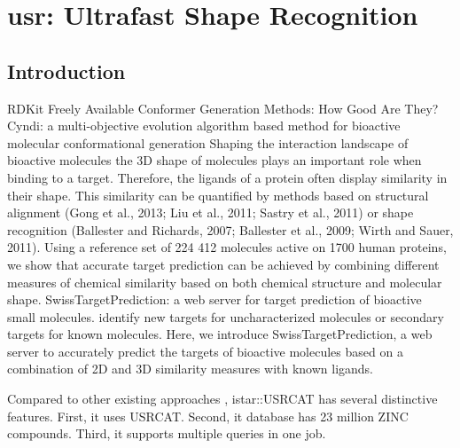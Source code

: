 \chapter{usr: Ultrafast Shape Recognition}

\section{Introduction}

RDKit
\citep{1127} Freely Available Conformer Generation Methods: How Good Are They?
\citep{1393,1394} Cyndi: a multi-objective evolution algorithm based method for bioactive molecular conformational generation
\citep{1407} Shaping the interaction landscape of bioactive molecules
\citep{1407} the 3D shape of molecules plays an important role when binding to a target. Therefore, the ligands of a protein often display similarity in their shape. This similarity can be quantified by methods based on structural alignment (Gong et al., 2013; Liu et al., 2011; Sastry et al., 2011) or shape recognition (Ballester and Richards, 2007; Ballester et al., 2009; Wirth and Sauer, 2011).
\citep{1407} Using a reference set of 224 412 molecules active on 1700 human proteins, we show that accurate target prediction can be achieved by combining different measures of chemical similarity based on both chemical structure and molecular shape.
\citep{1408} SwissTargetPrediction: a web server for target prediction of bioactive small molecules. identify new targets for uncharacterized molecules or secondary targets for known molecules. Here, we introduce SwissTargetPrediction, a web server to accurately predict the targets of bioactive molecules based on a combination of 2D and 3D similarity measures with known ligands.

Compared to other existing approaches \citep{1333,1334,1335,1337,1338,1331}, istar::USRCAT has several distinctive features. First, it uses USRCAT. Second, it database has 23 million ZINC compounds. Third, it supports multiple queries in one job.

\chapterend

